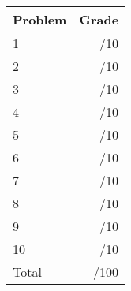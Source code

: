 \documentclass[12pt]{article}
\newcommand{\skipline}{\vspace{12pt}}
\begin{document}
\begin{table}[hbt]
\begin{center}
\begin{tabular}{|l|r|} \hline
Problem&Grade\\
\hline \hline
\cline{1-2} 1 & \enspace\enspace\enspace\enspace\enspace\enspace/10\\
\cline{1-2} 2 & \enspace\enspace\enspace\enspace\enspace\enspace/10\\
\cline{1-2} 3 & \enspace\enspace\enspace\enspace\enspace\enspace/10\\
\cline{1-2} 4 & \enspace\enspace\enspace\enspace\enspace\enspace/10\\
\cline{1-2} 5 & \enspace\enspace\enspace\enspace\enspace\enspace/10\\
\cline{1-2} 6 & \enspace\enspace\enspace\enspace\enspace\enspace/10\\
\cline{1-2} 7 & \enspace\enspace\enspace\enspace\enspace\enspace/10\\
\cline{1-2} 8 & \enspace\enspace\enspace\enspace\enspace\enspace/10\\
\cline{1-2} 9 & \enspace\enspace\enspace\enspace\enspace\enspace/10\\
\cline{1-2} 10 & \enspace\enspace\enspace\enspace\enspace\enspace/10\\
\cline{1-2} Total & \enspace\enspace\enspace\enspace\enspace\enspace/100\\
\hline
\end{tabular}

\skipline

\skipline

\skipline

\end{center}
\end{table}
\newpage
\end{document}
